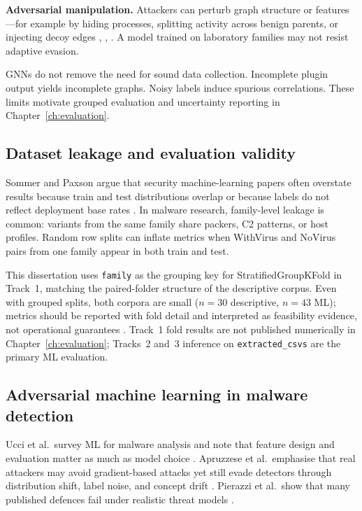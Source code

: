 \textbf{Adversarial manipulation.} Attackers can perturb graph structure or features---for example by hiding processes, splitting activity across benign parents, or injecting decoy edges \cite{jin2022adversarialgnn}, \cite{dai2023adversarial}, \cite{wu2023gnnsecurity}. A model trained on laboratory families may not resist adaptive evasion.

GNNs do not remove the need for sound data collection. Incomplete plugin output yields incomplete graphs. Noisy labels induce spurious correlations. These limits motivate grouped evaluation and uncertainty reporting in Chapter~\ref{ch:evaluation}.

\subsection{Dataset leakage and evaluation validity}

Sommer and Paxson argue that security machine-learning papers often overstate results because train and test distributions overlap or because labels do not reflect deployment base rates \cite{sommer2010outside}. In malware research, family-level leakage is common: variants from the same family share packers, C2 patterns, or host profiles. Random row splits can inflate metrics when WithVirus and NoVirus pairs from one family appear in both train and test.

This dissertation uses \texttt{family} as the grouping key for StratifiedGroupKFold in Track~1, matching the paired-folder structure of the descriptive corpus. Even with grouped splits, both corpora are small ($n{=}30$ descriptive, $n{=}43$ ML); metrics should be reported with fold detail and interpreted as feasibility evidence, not operational guarantees \cite{apruzzese2023sok}. Track~1 fold results are not published numerically in Chapter~\ref{ch:evaluation}; Tracks~2 and~3 inference on \texttt{extracted\_csvs} are the primary ML evaluation.

\subsection{Adversarial machine learning in malware detection}

Ucci et al.\ survey ML for malware analysis and note that feature design and evaluation matter as much as model choice \cite{ucci2019survey}. Apruzzese et al.\ emphasise that real attackers may avoid gradient-based attacks yet still evade detectors through distribution shift, label noise, and concept drift \cite{apruzzese2023sok}. Pierazzi et al.\ show that many published defences fail under realistic threat models \cite{pierazzi2020intriguing}.

